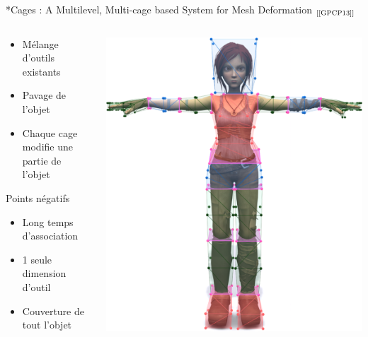 \documentclass[xcolor=x11names,compress]{beamer}
\renewcommand{\(}{\begin{columns}} \renewcommand{\)}{\end{columns}}
\newcommand{\<}[1]{\begin{column}{#1}} \renewcommand{\>}{\end{column}}
\begin{document}
\begin{frame}{*Cages : A Multilevel, Multi-cage based System for Mesh Deformation 
  $_{[\text{\cite{GPCP13}}]}$}
  \begin{columns}[T]
    \begin{column}{0.5\textwidth}
      \begin{itemize}
        \item Mélange d'outils existants
        \item Pavage de l'objet
        \item Chaque cage modifie une partie de l'objet
      \end{itemize}
      \begin{alertblock}{Points négatifs}
        \begin{itemize}
          \item Long temps d'association
          \item 1 seule dimension d'outil
          \item Couverture de tout l'objet
        \end{itemize}
      \end{alertblock}
    \end{column}
    \begin{column}{0.4\textwidth}
      \centering
      \includegraphics[scale=0.17]{starCages}
    \end{column}
  \end{columns}
\end{frame}
\end{document}

